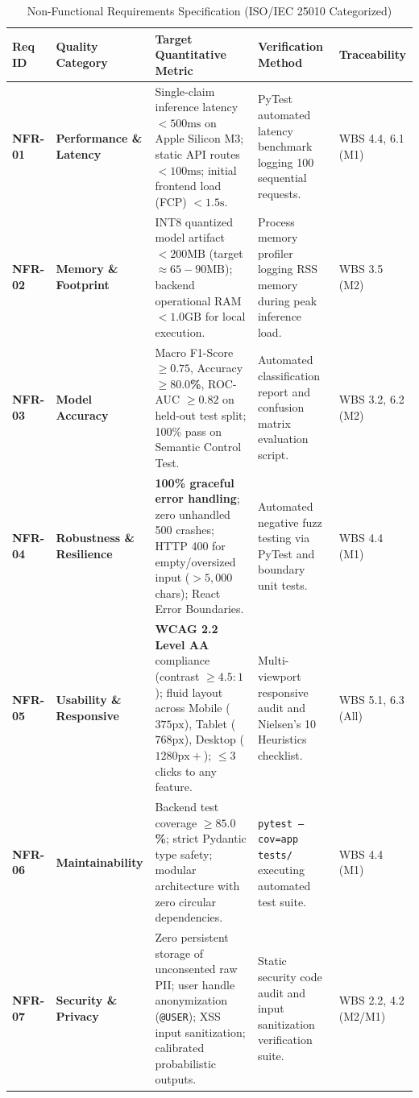 \documentclass[11pt, a4paper]{article}
\newcommand{\code}[1]{\texttt{\small #1}}
\begin{document}
\begin{table}[H]
  \centering
  \small
  \caption{Non-Functional Requirements Specification (ISO/IEC 25010 Categorized)}
  \label{tab:non-functional-requirements}
  \begin{tabularx}{\textwidth}{@{}C{1.2cm} L{2.8cm} Y L{3.2cm} C{1.9cm}@{}}
    \toprule
    \textbf{Req ID} & \textbf{Quality Category} & \textbf{Target Quantitative Metric} & \textbf{Verification Method} & \textbf{Traceability} \\
    \midrule
    \textbf{NFR-01} & \textbf{Performance \& Latency} &
    Single-claim inference latency \textbf{$<500\text{ms}$} on Apple Silicon M3; static API routes \textbf{$<100\text{ms}$}; initial frontend load (FCP) \textbf{$<1.5\text{s}$}. &
    PyTest automated latency benchmark logging 100 sequential requests. &
    WBS 4.4, 6.1 (M1) \\
    \textbf{NFR-02} & \textbf{Memory \& Footprint} &
    INT8 quantized model artifact \textbf{$<200\text{MB}$} (target $\approx 65-90\text{MB}$); backend operational RAM \textbf{$<1.0\text{GB}$} for local execution. &
    Process memory profiler logging RSS memory during peak inference load. &
    WBS 3.5 (M2) \\
    \textbf{NFR-03} & \textbf{Model Accuracy} &
    Macro F1-Score \textbf{$\ge 0.75$}, Accuracy \textbf{$\ge 80.0$\%}, ROC-AUC \textbf{$\ge 0.82$} on held-out test split; 100\% pass on Semantic Control Test. &
    Automated classification report and confusion matrix evaluation script. &
    WBS 3.2, 6.2 (M2) \\
    \textbf{NFR-04} & \textbf{Robustness \& Resilience} &
    \textbf{100\% graceful error handling}; zero unhandled 500 crashes; HTTP 400 for empty/oversized input ($>5,000$ chars); React Error Boundaries. &
    Automated negative fuzz testing via PyTest and boundary unit tests. &
    WBS 4.4 (M1) \\
    \textbf{NFR-05} & \textbf{Usability \& Responsive} &
    \textbf{WCAG 2.2 Level AA} compliance (contrast $\ge 4.5:1$); fluid layout across Mobile ($375\text{px}$), Tablet ($768\text{px}$), Desktop ($1280\text{px}+$); $\le 3$ clicks to any feature. &
    Multi-viewport responsive audit and Nielsen's 10 Heuristics checklist. &
    WBS 5.1, 6.3 (All) \\
    \textbf{NFR-06} & \textbf{Maintainability} &
    Backend test coverage \textbf{$\ge 85.0$\%}; strict Pydantic type safety; modular architecture with zero circular dependencies. &
    \code{pytest --cov=app tests/} executing automated test suite. &
    WBS 4.4 (M1) \\
    \textbf{NFR-07} & \textbf{Security \& Privacy} &
    Zero persistent storage of unconsented raw PII; user handle anonymization (\code{@USER}); XSS input sanitization; calibrated probabilistic outputs. &
    Static security code audit and input sanitization verification suite. &
    WBS 2.2, 4.2 (M2/M1) \\
    \bottomrule
  \end{tabularx}
\end{table}
\end{document}
